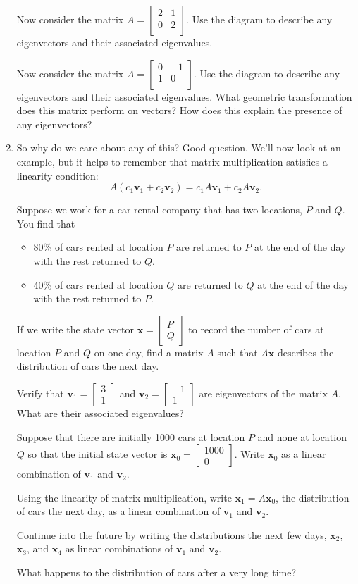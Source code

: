 \documentclass[12pt]{article}
\newcommand{\vs}[1]{\vspace{#1in}}
\newcommand{\vvec}{{\mathbf v}}
\newcommand{\xvec}{{\mathbf x}}
\newcommand{\twovec}[2]{\left[\begin{array}{r}#1 \\ #2
    \end{array}\right]}
\begin{document}
\begin{enumerate}
  \vs{1}
  Now consider the matrix
  $A=
  \left[
    \begin{array}{cc}
      2 & 1 \\
      0 & 2 \\
    \end{array}
  \right]$.  Use the diagram to describe any eigenvectors and their
  associated eigenvalues.

  \vs{1}
  Now consider the matrix
  $A=
  \left[
    \begin{array}{cc}
      0 & -1 \\
      1 & 0 \\
    \end{array}
  \right]$.  Use the diagram to describe any eigenvectors and their
  associated eigenvalues.  What geometric transformation does this
  matrix perform on vectors?  How does this explain the presence of
  any eigenvectors?

  \vs{1.25}
\item So why do we care about any of this?  Good question.  We'll now
  look at an example, but it helps to 
  remember that matrix multiplication satisfies a linearity condition:
  $$
  A\left(c_1\vvec_1 + c_2\vvec_2\right) = c_1A\vvec_1 + c_2A\vvec_2.
  $$

  \newpage
  Suppose we work for a car rental company that has two locations, $P$
  and $Q$.  You find that
  \begin{itemize}
  \item 80\% of cars rented at location $P$ are returned to $P$ at the
    end of the day with the rest returned to $Q$.
  \item 40\% of cars rented at location $Q$ are returned to $Q$ at the
    end of the day with the rest returned to $P$.
  \end{itemize}
  If we write the state vector $\xvec = \twovec PQ$ to record the
  number of cars at location $P$ and $Q$ on one day, find a matrix $A$
  such that $A\xvec$ describes the distribution of cars the next day.

  \vs{1}
  Verify that $\vvec_1=\twovec31$ and $\vvec_2=\twovec{-1}1$ are
  eigenvectors of the matrix $A$.  What are their associated
  eigenvalues?

  \vs{1}
  Suppose that there are initially 1000 cars at location $P$ and none
  at location $Q$ so that the initial state vector is
  $\xvec_0=\twovec{1000}0$.  Write $\xvec_0$ as a linear combination
  of $\vvec_1$ and $\vvec_2$.

  \vs{1}
  Using the linearity of matrix multiplication, write
  $\xvec_1=A\xvec_0$, the distribution of cars the next day, as a
  linear combination of $\vvec_1$ and $\vvec_2$.

  \vs{1}
  \newpage
  Continue into the future by writing the distributions the next few
  days, $\xvec_2$, $\xvec_3$, and $\xvec_4$ as linear combinations of
  $\vvec_1$ and $\vvec_2$.  

  \vs{1.5}
  What happens to the distribution of cars after a very long time?
  
  
  

\end{enumerate}
\end{document}
